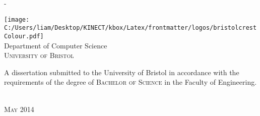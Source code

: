 \begin{titlingpage}
\begin{SingleSpace}
\begin{adjustwidth*}{\unitlength}{-\unitlength}
\begin{center}
\vspace{11mm}
\texttt{[image: C:/Users/liam/Desktop/KINECT/kbox/Latex/frontmatter/logos/bristolcrestColour.pdf]}\\
\vspace{6mm}
{\large Department of Computer Science\\
\textsc{University of Bristol}}\\
\vspace{11mm}
\begin{minipage}{10cm}
A dissertation submitted to the University of Bristol in accordance with the requirements of the degree of \textsc{Bachelor of Science} in the Faculty of Engineering.
\end{minipage}\\
\vspace{9mm}
{\large\textsc{May 2014}}
\vspace{12mm}
\end{center}
\begin{flushright}
\end{flushright}
\end{adjustwidth*}
\end{SingleSpace}
\end{titlingpage}